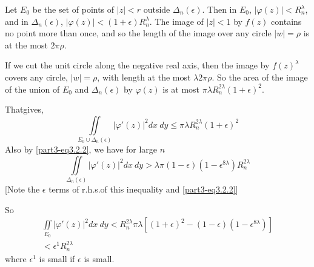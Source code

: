 Let $E_{0}$ be the set of points of $|z|<r$ outside
$\Delta_{n}(\epsilon)$. Then in $E_{0}$,
$|\varphi(z)|<R^{\lambda}_{n}$, and in $\Delta_{n}(\epsilon)$,
$|\varphi(z)|<(1+\epsilon)R^{\lambda}_{n}$. The image of $|z|<1$ by
$f(z)$ contains no point more than once, and so the length of the
image over any circle $|w|=\rho$ is at the most $2\pi\rho$.

If we cut the unit circle along the negative real axis, then the image
by $f(z)^{\lambda}$ covers any circle, $|w|=\rho$, with length at the
most $\lambda 2\pi\rho$. So the area of the image of the union of
$E_{0}$ and $\Delta_{n}(\epsilon)$ by $\varphi(z)$ is at most $\pi
\lambda R^{2\lambda}_{n}(1+\epsilon)^{2}$.

That\pageoriginale gives,
$$
\iint\limits_{E_{0}\cup
  \Delta_{n}(\epsilon)}|\varphi'(z)|^{2}dx\ dy\leq \pi\lambda
  R^{2\lambda}_{n}(1+\epsilon)^{2} 
$$
Also by \eqref{part3-eq3.2.2}, we have for large $n$
$$
\iint\limits_{\Delta_{n}(\epsilon)}|\varphi'(z)|^{2}dx\ dy>\lambda\pi
(1-\epsilon)(1-\epsilon^{8\lambda})R^{2\lambda}_{n}
$$
[Note the $\epsilon$ terms of r.h.s.\@ of this inequality and
  \eqref{part3-eq3.2.2}] 

So
\begin{gather*}
\iint\limits_{E_{0}}|\varphi'(z)|^{2}dx\ dy<R^{2\lambda}_{n}\pi\lambda\left[(1+\epsilon)^{2}-(1-\epsilon)(1-\epsilon^{8\lambda})\right]\\
<\epsilon^{1}R^{2\lambda}_{n}
\end{gather*}
where $\epsilon^{1}$ is small if $\epsilon$ is small.

